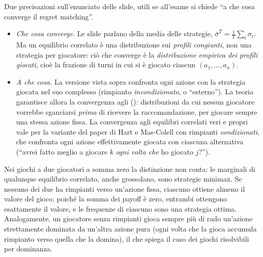\begin{attenzione}
Due precisazioni sull'enunciato delle slide, utili se all'esame si chiede ``a che cosa
converge il regret matching''.
\begin{itemize}
  \item \emph{Che cosa converge.} Le slide parlano della media delle strategie,
        $\bar\sigma^T = \tfrac1T\sum_t \sigma_t$. Ma un equilibrio correlato è una
        distribuzione sui \emph{profili congiunti}, non una strategia per giocatore: ciò
        che converge è la \emph{distribuzione empirica dei profili giocati}, cioè la
        frazione di turni in cui si è giocato ciascun $(a_1,\dots,a_n)$.
  \item \emph{A che cosa.} La versione vista sopra confronta ogni azione con la strategia
        giocata nel suo complesso (rimpianto \emph{incondizionato}, o ``esterno''). La
        teoria garantisce allora la convergenza agli 
        (): distribuzioni da cui nessun giocatore vorrebbe
        sganciarsi \emph{prima} di ricevere la raccomandazione, per giocare sempre una
        stessa azione fissa. La convergenza agli equilibri correlati veri e propri vale per
        la variante del paper di Hart e Mas-Colell con rimpianti \emph{condizionati}, che
        confronta ogni azione effettivamente giocata con ciascuna alternativa (``avrei
        fatto meglio a giocare $k$ \emph{ogni volta che} ho giocato $j$?'').
\end{itemize}
\end{attenzione}

\begin{extra}
Nei giochi a due giocatori a somma zero la distinzione non conta: le marginali di qualunque
equilibrio correlato, anche grossolano, sono strategie minimax. Se nessuno dei due ha
rimpianti verso un'azione fissa, ciascuno ottiene almeno il valore del gioco; poiché la somma
dei payoff è zero, entrambi ottengono esattamente il valore, e le frequenze di ciascuno sono
una strategia ottima. Analogamente, un giocatore senza rimpianti gioca sempre più di rado
un'azione strettamente dominata da un'altra azione pura (ogni volta che la gioca accumula
rimpianto verso quella che la domina), il che spiega il caso dei giochi risolvibili per
dominanza.
\end{extra}


